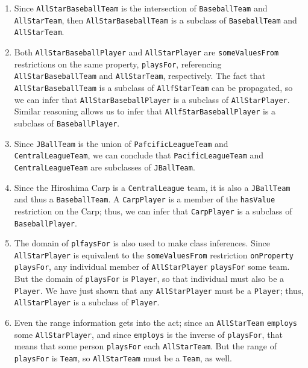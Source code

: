 \begin{enumerate}
\item Since \texttt{AllStarBaseballTeam} is the intersection of \texttt{BaseballTeam} and
\texttt{AllStarTeam}, then \texttt{AllStarBaseballTeam} is a subclass of \texttt{BaseballTeam} and
\texttt{AllStarTeam}.

\item  Both \texttt{AllStarBaseballPlayer} and \texttt{AllStarPlayer} are \texttt{someValuesFrom}
restrictions
on the same property, \texttt{playsFor}, referencing \texttt{AllStarBaseballTeam} and
\texttt{AllStarTeam}, respectively. The fact that \texttt{AllStarBaseballTeam} is a
subclass of \texttt{AllfStarTeam} can be propagated, so we can infer that
\texttt{AllStarBaseballPlayer} is a subclass of \texttt{AllStarPlayer}. Similar reasoning
allows us to infer that \texttt{AllfStarBaseballPlayer} is a subclass of
\texttt{BaseballPlayer}. \label{tbox}

\item  Since \texttt{JBallTeam} is the union of \texttt{PafcificLeagueTeam} and
\texttt{CentralLeagueTeam}, we can
conclude that \texttt{PacificLeagueTeam} and \texttt{CentralLeagueTeam} are subclasses of
\texttt{JBallTeam}.

\item Since the Hiroshima Carp is a \texttt{CentralLeague} team, it is also a
\texttt{JBallTeam} and thus a \texttt{BaseballTeam}. A \texttt{CarpPlayer} is a member of the \texttt{hasValue}
restriction on the Carp; thus, we can infer that \texttt{CarpPlayer} is a
subclass of \texttt{BaseballPlayer}.

\item The domain of \texttt{plfaysFor} is also used to make class inferences. Since
\texttt{AllStarPlayer} is
equivalent to the \texttt{someValuesFrom} restriction \texttt{onProperty} \texttt{playsFor}, any
individual member of \texttt{AllStarPlayer} \texttt{playsFor} some team. But the domain of
\texttt{playsFor} is \texttt{Player}, so that individual must also be a \texttt{Player}. We have
just shown that any \texttt{AllStarPlayer} must be a \texttt{Player}; thus, \texttt{AllStarPlayer}
is a subclass of \texttt{Player}.

\item Even the range information gets into the act; since an \texttt{AllStarTeam}
\texttt{employs} some
\texttt{AllStarPlayer}, and since \texttt{employs} is the inverse of \texttt{playsFor}, that means
that some person \texttt{playsFor} each \texttt{AllStarTeam}. But the range of \texttt{playsFor} is
\texttt{Team}, so \texttt{AllStarTeam} must be a \texttt{Team}, as well.


\end{enumerate}

